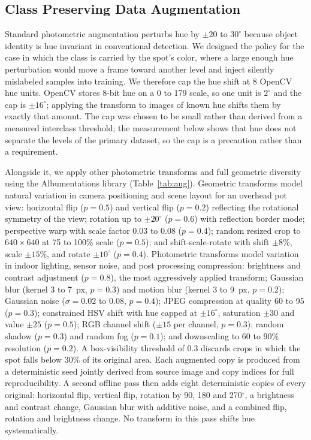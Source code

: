 ﻿\documentclass[journal]{IEEEtran}
\begin{document}
\subsection{Class Preserving Data Augmentation}
\label{sec:aug}
Standard photometric augmentation perturbs hue by $\pm 20$ to $30^{\circ}$ because object identity is hue invariant in conventional detection. We designed the policy for the case in which the class is carried by the spot's color, where a large enough hue perturbation would move a frame toward another level and inject silently mislabeled samples into training. We therefore cap the hue shift at 8 OpenCV hue units. OpenCV stores 8-bit hue on a 0 to 179 scale, so one unit is $2^{\circ}$ and the cap is $\pm 16^{\circ}$; applying the transform to images of known hue shifts them by exactly that amount. The cap was chosen to be small rather than derived from a measured interclass threshold; the measurement below shows that hue does not separate the levels of the primary dataset, so the cap is a precaution rather than a requirement.

Alongside it, we apply other photometric transforms and full geometric diversity using the Albumentations library (Table~\ref{tab:aug}). Geometric transforms model natural variation in camera positioning and scene layout for an overhead pot view: horizontal flip ($p=0.5$) and vertical flip ($p=0.2$) reflecting the rotational symmetry of the view; rotation up to $\pm 20^{\circ}$ ($p=0.6$) with reflection border mode; perspective warp with scale factor 0.03 to 0.08 ($p=0.4$); random resized crop to $640 \times 640$ at 75 to 100\% scale ($p=0.5$); and shift-scale-rotate with shift $\pm 8\%$, scale $\pm 15\%$, and rotate $\pm 10^{\circ}$ ($p=0.4$). Photometric transforms model variation in indoor lighting, sensor noise, and post processing compression: brightness and contrast adjustment ($p=0.8$), the most aggressively applied transform; Gaussian blur (kernel 3 to 7~px, $p=0.3$) and motion blur (kernel 3 to 9~px, $p=0.2$); Gaussian noise ($\sigma = 0.02$ to $0.08$, $p=0.4$); JPEG compression at quality 60 to 95 ($p=0.3$); constrained HSV shift with hue capped at $\pm 16^{\circ}$, saturation $\pm 30$ and value $\pm 25$ ($p=0.5$); RGB channel shift ($\pm 15$ per channel, $p=0.3$); random shadow ($p=0.3$) and random fog ($p=0.1$); and downscaling to 60 to 90\% resolution ($p=0.2$). A box-visibility threshold of 0.3 discards crops in which the spot falls below 30\% of its original area. Each augmented copy is produced from a deterministic seed jointly derived from source image and copy indices for full reproducibility. A second offline pass then adds eight deterministic copies of every original: horizontal flip, vertical flip, rotation by 90, 180 and 270$^{\circ}$, a brightness and contrast change, Gaussian blur with additive noise, and a combined flip, rotation and brightness change. No transform in this pass shifts hue systematically.
\end{document}
